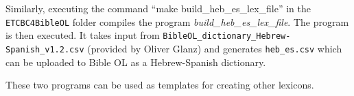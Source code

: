 \documentclass[11pt,oneside,a4paper,article]{memoir}
\begin{document}
Similarly, executing the command ``make build\_heb\_es\_lex\_file'' in the \texttt{ETCBC4BibleOL} folder compiles the
program \emph{build\_heb\_es\_lex\_file}. The program is then executed. It takes input from
\texttt{BibleOL\_dictionary\_Hebrew-Spanish\_v1.2.csv} (provided by Oliver Glanz) and generates
\texttt{heb\_es.csv} which can be uploaded to Bible OL as a Hebrew-Spanish dictionary.

These two programs can be used as templates for creating other lexicons.
\end{document}
